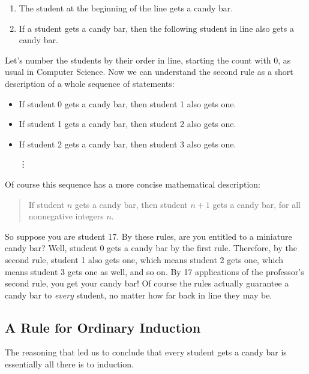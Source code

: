 \begin{enumerate}
\item The student at the beginning of the line gets a candy bar.
\item If a student gets a candy bar, then the following student in line
  also gets a candy bar.
\end{enumerate}
%
Let's number the students by their order in line, starting the count with
0, as usual in Computer Science.  Now we can understand the second rule as
a short description of a whole sequence of statements:
%
\begin{itemize}
\item If student 0 gets a candy bar, then student 1 also gets one.
\item If student 1 gets a candy bar, then student 2 also gets one.
\item If student 2 gets a candy bar, then student 3 also gets one.

\hspace{1.2in} \vdots
\end{itemize}
%
Of course this sequence has a more concise mathematical description:
\begin{quote}
  If student $n$ gets a candy bar, then student $n+1$ gets a
  candy bar, for all nonnegative integers $n$.
\end{quote}
So suppose you are student 17.  By these rules, are you entitled to a
miniature candy bar?  Well, student 0 gets a candy bar by the first rule.
Therefore, by the second rule, student 1 also gets one, which means
student 2 gets one, which means student 3 gets one as well, and so on.  By
17 applications of the professor's second rule, you get your candy bar!
Of course the rules actually guarantee a candy bar to \emph{every}
student, no matter how far back in line they may be.


\subsection{A Rule for Ordinary Induction}

The reasoning that led us to conclude that every student gets a candy bar is 
essentially all there is to induction.
\iffalse
So our claim that all the Professor's students get a candy bar was simply
an application of the Induction Rule with $P(n)$ defined to be the
predicate, ``student $n$ gets a candy bar.''
\fi

